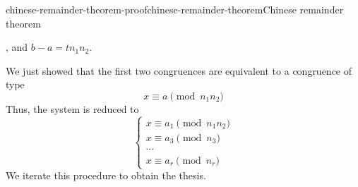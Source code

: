 \documentclass[preview]{standalone}
\begin{document}
\begin{snippetproof}{chinese-remainder-theorem-proof}{chinese-remainder-theorem}{Chinese remainder theorem}
\begin{itemize}
\begin{enumerate}
            \coprime, and \(b-a = tn_1n_2\).
        \end{enumerate}
        We just showed that the first two congruences are equivalent to a congruence of type
        \[
            x \equiv a \pmod{n_1n_2}
        \]
        Thus, the system is reduced to
        \[
            \begin{cases}
                x \equiv a_1 \pmod{n_1n_2} \\
                x \equiv a_3 \pmod{n_3} \\
                \cdots \\
                x \equiv a_r \pmod{n_r}
            \end{cases}
        \]
        We iterate this procedure to obtain the thesis.
    \end{itemize}
\end{snippetproof}
\end{document}
